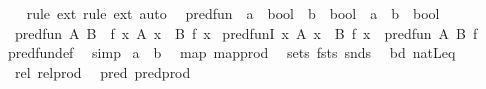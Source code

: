 \begin{isabellebody}
%
\isadelimproof
\ \ %
\endisadelimproof
%
\isatagproof
{}\isamarkupfalse%
\ {\isacharparenleft}{\kern0pt}rule\ ext{\isacharcomma}{\kern0pt}\ rule\ ext{\isacharparenright}{\kern0pt}\ auto%
\endisatagproof
{\isafoldproof}%
%
\isadelimproof
\isanewline
%
\endisadelimproof
\isanewline
{}\isamarkupfalse%
\isanewline
\ \ pred{\isacharunderscore}{\kern0pt}fun\ {\isacharcolon}{\kern0pt}{\isacharcolon}{\kern0pt}\ {\isachardoublequoteopen}{\isacharparenleft}{\kern0pt}{\isacharprime}{\kern0pt}a\ {\isasymRightarrow}\ bool{\isacharparenright}{\kern0pt}\ {\isasymRightarrow}\ {\isacharparenleft}{\kern0pt}{\isacharprime}{\kern0pt}b\ {\isasymRightarrow}\ bool{\isacharparenright}{\kern0pt}\ {\isasymRightarrow}\ {\isacharparenleft}{\kern0pt}{\isacharprime}{\kern0pt}a\ {\isasymRightarrow}\ {\isacharprime}{\kern0pt}b{\isacharparenright}{\kern0pt}\ {\isasymRightarrow}\ bool{\isachardoublequoteclose}\isanewline
{}\isanewline
\ \ {\isachardoublequoteopen}pred{\isacharunderscore}{\kern0pt}fun\ A\ B\ {\isacharequal}{\kern0pt}\ {\isacharparenleft}{\kern0pt}{\isasymlambda}f{\isachardot}{\kern0pt}\ {\isasymforall}x{\isachardot}{\kern0pt}\ A\ x\ {\isasymlongrightarrow}\ B\ {\isacharparenleft}{\kern0pt}f\ x{\isacharparenright}{\kern0pt}{\isacharparenright}{\kern0pt}{\isachardoublequoteclose}\isanewline
\isanewline
{}\isamarkupfalse%
\ pred{\isacharunderscore}{\kern0pt}funI{\isacharcolon}{\kern0pt}\ {\isachardoublequoteopen}{\isacharparenleft}{\kern0pt}{\isasymAnd}x{\isachardot}{\kern0pt}\ A\ x\ {\isasymLongrightarrow}\ B\ {\isacharparenleft}{\kern0pt}f\ x{\isacharparenright}{\kern0pt}{\isacharparenright}{\kern0pt}\ {\isasymLongrightarrow}\ pred{\isacharunderscore}{\kern0pt}fun\ A\ B\ f{\isachardoublequoteclose}\isanewline
%
\isadelimproof
\ \ %
\endisadelimproof
%
\isatagproof
{}\isamarkupfalse%
\ pred{\isacharunderscore}{\kern0pt}fun{\isacharunderscore}{\kern0pt}def\ \isamarkupfalse%
\ simp%
\endisatagproof
{\isafoldproof}%
%
\isadelimproof
\isanewline
%
\endisadelimproof
\isanewline
{}\isamarkupfalse%
\ {\isachardoublequoteopen}{\isacharprime}{\kern0pt}a\ {\isasymtimes}\ {\isacharprime}{\kern0pt}b{\isachardoublequoteclose}\isanewline
\ \ map{\isacharcolon}{\kern0pt}\ map{\isacharunderscore}{\kern0pt}prod\isanewline
\ \ sets{\isacharcolon}{\kern0pt}\ fsts\ snds\isanewline
\ \ bd{\isacharcolon}{\kern0pt}\ natLeq\isanewline
\ \ rel{\isacharcolon}{\kern0pt}\ rel{\isacharunderscore}{\kern0pt}prod\isanewline
\ \ pred{\isacharcolon}{\kern0pt}\ pred{\isacharunderscore}{\kern0pt}prod\isanewline

\end{isabellebody}
